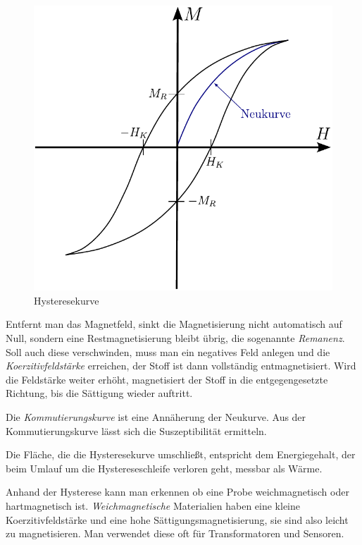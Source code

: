\documentclass[12pt,a4paper]{scrartcl}
\numberwithin{equation}{section} %
\begin{document}
\begin{figure}[ht]
	\centering
	\includegraphics[scale=0.7]{../media/B2.4/Hysteresekurve.pdf}
	\caption{Hysteresekurve}
	\label{Abb: Hysteresekurve}
\end{figure}

Entfernt man das Magnetfeld, sinkt die Magnetisierung nicht automatisch auf Null, sondern eine Restmagnetisierung bleibt übrig, die sogenannte \emph{Remanenz}. Soll auch diese verschwinden, muss man ein negatives Feld anlegen und die \emph{Koerzitivfeldstärke} erreichen, der Stoff ist dann vollständig entmagnetisiert. Wird die Feldstärke weiter erhöht, magnetisiert der Stoff in die entgegengesetzte Richtung, bis die Sättigung wieder auftritt.

Die \emph{Kommutierungskurve} ist eine Annäherung der Neukurve. Aus der Kommutierungskurve lässt sich die Suszeptibilität ermitteln.

Die Fläche, die die Hysteresekurve umschließt, entspricht dem Energiegehalt, der beim Umlauf um die Hystereseschleife verloren geht, messbar als Wärme.

Anhand der Hysterese kann man erkennen ob eine Probe weichmagnetisch oder hartmagnetisch ist. \emph{Weichmagnetische} Materialien haben eine kleine Koerzitivfeldstärke und eine hohe Sättigungsmagnetisierung, sie sind also leicht zu magnetisieren. Man verwendet diese oft für Transformatoren und Sensoren.
\end{document}
